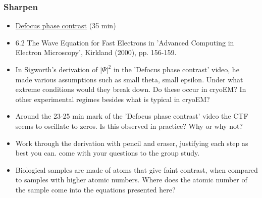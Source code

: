 \documentclass[11pt, oneside]{article}   	%
\begin{document}
\subsubsection{Sharpen}
\begin{itemize}
	\item \href{https://youtu.be/m2Hm1ziZFZg}{Defocus phase contrast} (35 min)
	\item 6.2 The Wave Equation for Fast Electrons in 'Advanced Computing in Electron Microscopy', Kirkland (2000), pp. 156-159.
\end{itemize}
\begin{itemize}
\item In Sigworth's derivation of $|\Psi|^2$ in the 'Defocus phase contrast' video, he made various assumptions such as small theta, small epsilon. Under what extreme conditions would they break down. Do these occur in cryoEM? In other experimental regimes besides what is typical in cryoEM?
\item Around the 23-25 min mark of the 'Defocus phase contrast' video the CTF seems to oscillate to zeros. Is this observed in practice? Why or why not?
\item Work through the derivation with pencil and eraser, justifying each step as best you can. come with your questions to the group study.
\item Biological samples are made of atoms that give faint contrast, when compared to samples with higher atomic numbers. Where does the atomic number of the sample come into the equations presented here? 
\end{itemize}

\pagebreak
\end{document}

